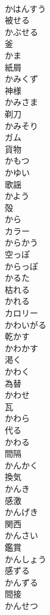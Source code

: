 \documentclass[8pt]{extreport}
\begin{document}
\begin{CJK}{UTF8}{min}
\\	かはんすう	
\\	被せる 
\\	かぶせる	
\\	釜 
\\	かま	
\\	紙屑 
\\	かみくず	
\\	神様 
\\	かみさま	
\\	剃刀 
\\	かみそり	
\\	ガム	
\\	貨物 
\\	かもつ	
\\	かゆい	
\\	歌謡 
\\	かよう	
\\	殻 
\\	から	
\\	カラー	
\\	からかう	
\\	空っぽ 
\\	からっぽ	
\\	かるた	
\\	枯れる 
\\	かれる	
\\	カロリー	
\\	かわいがる	
\\	乾かす 
\\	かわかす	
\\	渇く 
\\	かわく	
\\	為替 
\\	かわせ	
\\	瓦 
\\	かわら	
\\	代る 
\\	かわる	
\\	間隔 
\\	かんかく	
\\	換気 
\\	かんき	
\\	感激 
\\	かんげき	
\\	関西 
\\	かんさい	
\\	鑑賞 
\\	かんしょう	
\\	感ずる 
\\	かんずる	
\\	間接 
\\	かんせつ	

\end{CJK}
\end{document}
